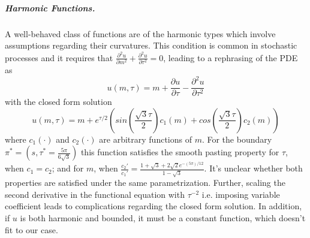 \subparagraph{Harmonic Functions.} A well-behaved class of functions are of the harmonic types which involve assumptions regarding their curvatures. This condition is common in stochastic processes and it requires that $\frac{\partial ^2u}{\partial m^2} + \frac{\partial ^2u}{\partial \tau^2} = 0$, leading to a rephrasing of the PDE as 
\[ u(m,\tau) = m + \frac{\partial u}{\partial \tau} - \frac{\partial ^2u}{\partial \tau^2}\]
with the closed form solution 
\[ u(m,\tau) = m + e^{\tau/2} \left( sin \left(\frac{\sqrt{3}\tau}{2}\right)c_1(m) + cos\left(\frac{\sqrt{3}\tau}{2} \right) c_2(m) \right)\]
where $c_1(\cdot)$ and $c_2(\cdot)$ are arbitrary functions of $m$. For the boundary $\pi^* = (s,\tau^* = \frac{5\pi}{6\sqrt{3}})$ this function satisfies the smooth pasting property for $\tau$, when $c_1=c_2$; and for $m$, when $\frac{c_2'}{c_1'} = \frac{1 + \sqrt{3} + 2 \sqrt{2}e^{-(5\pi)/12}}{1-\sqrt{3}}$. It's unclear whether both properties are satisfied under the same parametrization. Further, scaling the second derivative in the functional equation with $\tau^{-2}$ i.e. imposing variable coefficient leads to complications regarding the closed form solution. In addition, if $u$ is both harmonic and bounded, it must be a constant function, which doesn't fit to our case.

